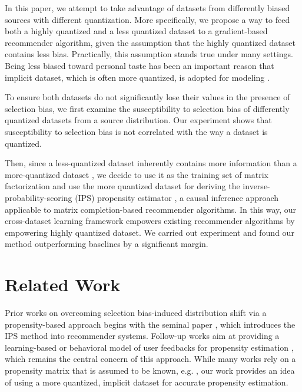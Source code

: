 \documentclass{article}
\begin{document}
In this paper, we attempt to take advantage of datasets from differently biased sources with different quantization. More specifically, we propose a way to feed both a highly quantized and a less quantized dataset to a gradient-based recommender algorithm, given the assumption that the highly quantized dataset contains less bias. Practically, this assumption stands true under many settings. Being less biased toward personal taste has been an important reason that implicit dataset, which is often more quantized, is adopted for modeling \cite{amatriain2009like} \cite{jawaheer2010comparison}.

To ensure both datasets do not significantly lose their values in the presence of selection bias, we first examine the susceptibility to selection bias of differently quantized datasets from a source distribution. Our experiment shows that susceptibility to selection bias is not correlated with the way a dataset is quantized. 

Then, since a less-quantized dataset inherently contains more information than a more-quantized dataset \cite{widrow1996statistical}, we decide to use it as the training set of matrix factorization and use the more quantized dataset for deriving the inverse-probability-scoring (IPS) propensity estimator \cite{thompson2012sampling} \cite{imbens2015causal}, a causal inference approach applicable to matrix completion-based recommender algorithms. In this way, our cross-dataset learning framework empowers existing recommender algorithms by empowering highly quantized dataset. We carried out experiment and found our method outperforming baselines by a significant margin.


\section{Related Work}
Prior works on overcoming selection bias-induced distribution shift via a propensity-based approach begins with the seminal paper \cite{schnabel2016recommendations}, which introduces the IPS method into recommender systems. Follow-up works aim at providing a learning-based or behavioral model of user feedbacks for propensity estimation \cite{joachims2017unbiased} \cite{yang2018unbiased}, which remains the central concern of this approach. While many works rely on a propensity matrix that is assumed to be known, e.g. \cite{something}, our work provides an idea of using a more quantized, implicit dataset for accurate propensity estimation.
\end{document}
